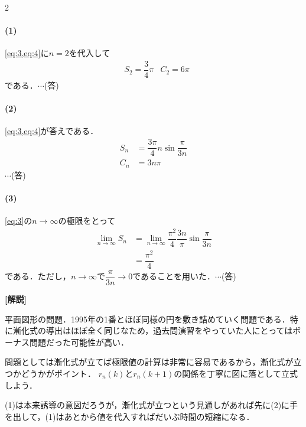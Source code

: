 \documentclass[../../main.tex]{subfiles}
\begin{document}
\begin{multicols}{2}
  \paragraph{(1)}
  \cref{eq:3,eq:4}に$n=2$を代入して
  \begin{align}
    & S_2 = \dfrac{3}{4}\pi & C_2 = 6\pi
  \end{align}
  である．$\cdots$(答)

  \paragraph{(2)}
  \cref{eq:3,eq:4}が答えである．
  \begin{align}
    S_n & = \dfrac{3\pi}{4} n \sin \dfrac{\pi}{3n} \\
    C_n & = 3n\pi
  \end{align}$\cdots$(答)

  \paragraph{(3)}
  \cref{eq:3}の$n\to\infty$の極限をとって
  \begin{align}
    \lim_{n\to\infty} S_n
    & = \lim_{n\to\infty} \dfrac{\pi^2}{4} \dfrac{3n}{\pi} \sin \dfrac{\pi}{3n} \\
    & = \dfrac{\pi^2}{4}
  \end{align}
  である．ただし，$n\to\infty$で$\dfrac{\pi}{3n} \to 0$であることを用いた．$\cdots$(答)

  {\bf [解説]}

  平面図形の問題．1995年の1番とほぼ同様の円を敷き詰めていく問題である．特に漸化式の導出はほぼ全く同じなため，過去問演習をやっていた人にとってはボーナス問題だった可能性が高い．

  問題としては漸化式が立てば極限値の計算は非常に容易であるから，漸化式が立つかどうかがポイント．
  $r_n(k)$と$r_n(k+1)$の関係を丁寧に図に落として立式しよう．

  (1)は本来誘導の意図だろうが，漸化式が立つという見通しがあれば先に(2)に手を出して，(1)はあとから値を代入すればだいぶ時間の短縮になる．

  \newpage
\end{multicols}
\end{document}
